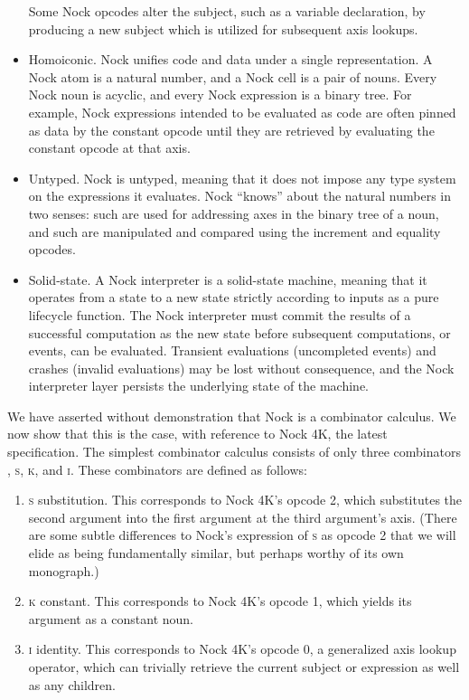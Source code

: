 \documentclass[twoside]{article}
\begin{document}
\begin{itemize}
    \noindent
    Some Nock opcodes alter the subject, such as a variable declaration, by producing a new subject which is utilized for subsequent axis lookups.

  \item  Homoiconic.  Nock unifies code and data under a single representation.  A Nock atom is a natural number, and a Nock cell is a pair of nouns.  Every Nock noun is acyclic, and every Nock expression is a binary tree.  For example, Nock expressions intended to be evaluated as code are often pinned as data by the constant opcode until they are retrieved by evaluating the constant opcode at that axis.

  \item  Untyped.  Nock is untyped, meaning that it does not impose any type system on the expressions it evaluates.  Nock ``knows'' about the natural numbers in two senses:  such are used for addressing axes in the binary tree of a noun, and such are manipulated and compared using the increment and equality opcodes.

  \item  Solid-state.  A Nock interpreter is a solid-state machine, meaning that it operates from a state to a new state strictly according to inputs as a pure lifecycle function.  The Nock interpreter must commit the results of a successful computation as the new state before subsequent computations, or events, can be evaluated.  Transient evaluations (uncompleted events) and crashes (invalid evaluations) may be lost without consequence, and the Nock interpreter layer persists the underlying state of the machine.
\end{itemize}

We have asserted without demonstration that Nock is a combinator calculus.  We now show that this is the case, with reference to Nock 4K, the latest specification.  The simplest combinator calculus consists of only three combinators \citep{SomeoneSmart}, \textsc{s}, \textsc{k}, and \textsc{i}.  These combinators are defined as follows:

\begin{enumerate}
  \item  \textsc{s} substitution.  This corresponds to Nock 4K's opcode 2, which substitutes the second argument into the first argument at the third argument's axis.  (There are some subtle differences to Nock's expression of \textsc{s} as opcode 2 that we will elide as being fundamentally similar, but perhaps worthy of its own monograph.)
  \item  \textsc{k} constant.  This corresponds to Nock 4K's opcode 1, which yields its argument as a constant noun.
  \item  \textsc{i} identity.  This corresponds to Nock 4K's opcode 0, a generalized axis lookup operator, which can trivially retrieve the current subject or expression as well as any children.
\end{enumerate}
\end{document}
